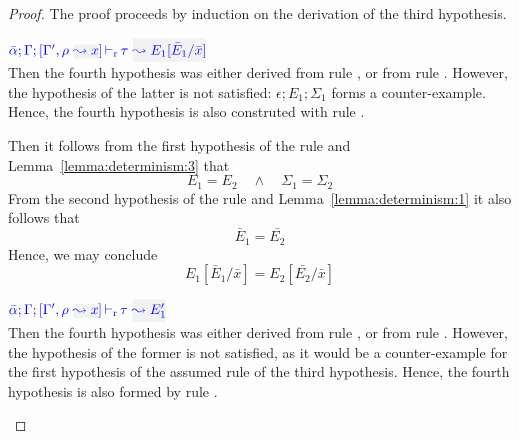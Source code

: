 \begin{proof}
The proof proceeds by induction on the derivation of the third hypothesis.
\begin{description}
\setlength{\itemsep}{1em}
\item[\fbox{\rref{L-RuleMatch}}]\quad$\dlres{\bar{\alpha}}{\tenv}{\tenv',\ie{\rulet}{x}}{\type}{E_1[\bar{E}_1/\bar{x}]}$\\

  Then the fourth hypothesis was either derived from rule ,
  or from rule . However, the hypothesis of the latter is
  not satisfied: $\epsilon;E_1;\Sigma_1$ forms a counter-example. Hence, the fourth
  hypothesis is also construted with rule .

  Then it follows from the first hypothesis of the rule and Lemma~\ref{lemma:determinism:3} that
\begin{equation*}
  E_1 = E_2 \quad\wedge\quad \Sigma_1 = \Sigma_2
\end{equation*}
  From the second hypothesis of the rule and Lemma~\ref{lemma:determinism:1} it also follows that
\begin{equation*}
  \bar{E}_1 = \bar{E_2}
\end{equation*}
  Hence, we may conclude
\begin{equation*}
  E_1[\bar{E}_1/\bar{x}] = E_2[\bar{E_2}/\bar{x}]
\end{equation*}


\item[\fbox{\rref{L-RuleNoMatch}}]\quad$\dlres{\bar{\alpha}}{\tenv}{\tenv',\ie{\rulet}{x}}{\type}{E_1'}$\\

  Then the fourth hypothesis was either derived from rule ,
  or from rule . However, the hypothesis of the former is
  not satisfied, as it would be a counter-example for the first hypothesis of
  the assumed rule of the third hypothesis. Hence, the fourth hypothesis is also
  formed by rule .


\end{description}
\end{proof}
